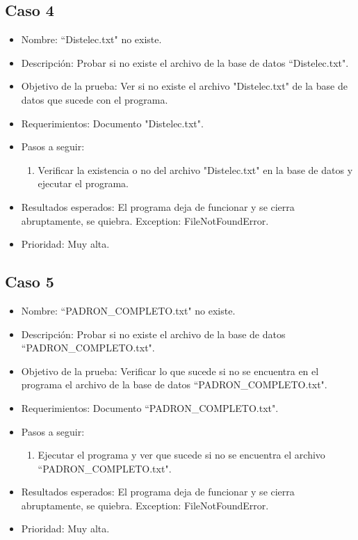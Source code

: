 \documentclass[conference]{IEEEtran}
\begin{document}
\subsection*{Caso 4}
\begin{itemize}
\item Nombre: ``Distelec.txt"  no existe. 
\item Descripción: Probar si no existe el archivo de la base de datos ``Distelec.txt".
\item Objetivo de la prueba: Ver si no existe el archivo "Distelec.txt" de la base de datos que sucede con el programa.
\item Requerimientos: Documento "Distelec.txt".
\item Pasos a seguir: 
\begin{enumerate}
\item Verificar la existencia o no del archivo "Distelec.txt" en la base de datos y ejecutar el programa. 
\end{enumerate} 
\item Resultados esperados: El programa deja de funcionar y se cierra abruptamente, se quiebra. Exception: FileNotFoundError.
\item Prioridad: Muy alta.
\end{itemize}

\subsection*{Caso 5}
\begin{itemize}
\item Nombre: ``PADRON\_COMPLETO.txt"  no existe.
\item Descripción: Probar si no existe el archivo de la base de datos ``PADRON\_COMPLETO.txt".
\item Objetivo de la prueba: Verificar lo que sucede si no se encuentra en el programa el archivo de la base de datos ``PADRON\_COMPLETO.txt".
\item Requerimientos: Documento ``PADRON\_COMPLETO.txt".
\item Pasos a seguir:
\begin{enumerate}
\item Ejecutar el programa y ver que sucede si no se encuentra el archivo ``PADRON\_COMPLETO.txt".
\end{enumerate}
\item Resultados esperados: El programa deja de funcionar y se cierra abruptamente, se quiebra. Exception: FileNotFoundError.
\item Prioridad: Muy alta. 
\end{itemize}
\end{document}
